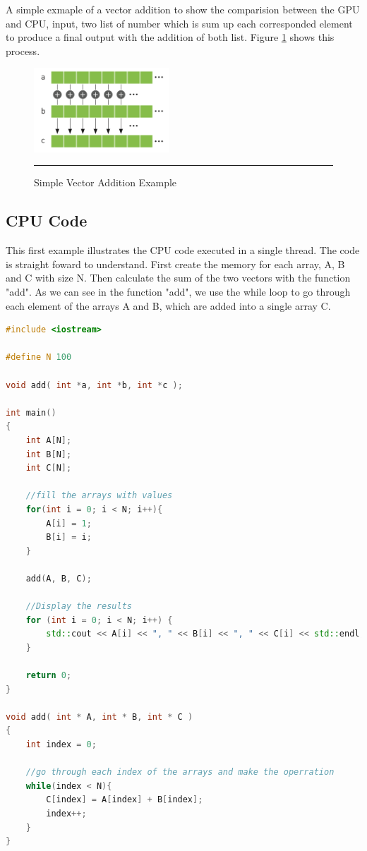A simple exmaple of a vector addition to show the comparision between the GPU and CPU, input, two list of number which is sum up each corresponded element to produce a final output with the addition of both list. Figure \ref{fig:sum} shows this process.

\begin{figure}[htbp]
	\centering
		\includegraphics[width=0.45\textwidth]{Figures/sum.png}
		\rule{35em}{0.3pt}
	\caption[Vector Addition Example]{Simple Vector Addition Example}
	\label{fig:sum}
\end{figure}

\subsection{CPU Code}

This first example illustrates the CPU code executed in a single thread. The code is straight foward to understand. First create the memory for each array, A, B and C with size N. Then calculate the sum of the two vectors with the function "add". As we can see in the function "add", we use the while loop to go through each element of the arrays A and B, which are added into a single array C.

\begin{lstlisting}[language=C++, caption={CPU Vector Addition}]
#include <iostream>

#define N 100

void add( int *a, int *b, int *c );

int main()
{
    int A[N];
    int B[N];
    int C[N];
    
    //fill the arrays with values
    for(int i = 0; i < N; i++){
        A[i] = 1;
        B[i] = i;
    }
    
    add(A, B, C);
    
    //Display the results
    for (int i = 0; i < N; i++) {
        std::cout << A[i] << ", " << B[i] << ", " << C[i] << std::endl;
    }
    
    return 0;
}

void add( int * A, int * B, int * C )
{
    int index = 0;
    
    //go through each index of the arrays and make the operration
    while(index < N){
        C[index] = A[index] + B[index];
        index++;
    }
}

\end{lstlisting}

